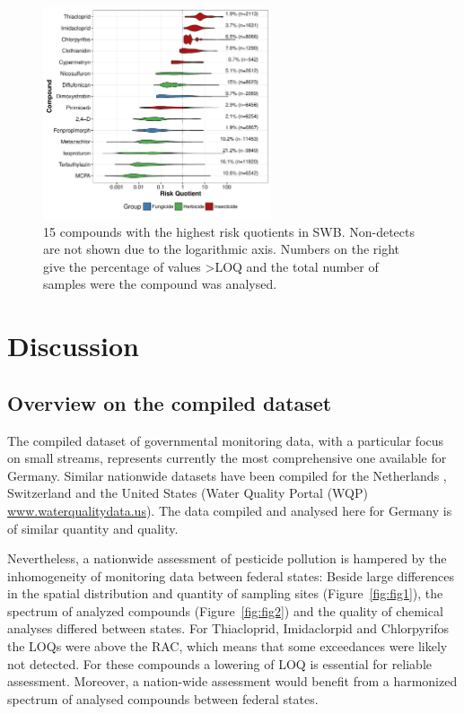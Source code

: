 \documentclass[journal=esthag,manuscript=article]{achemso}
\begin{document}
\begin{figure}[ht]
  \includegraphics[width=0.6\textwidth]{figure6.pdf}
  \caption{15 compounds with the highest risk quotients in SWB. Non-detects are not shown due to the logarithmic axis. Numbers on the right give the percentage of values \textgreater LOQ and the total number of samples were the compound was analysed.
  }
  \label{fig:fig6}
\end{figure}




\section{Discussion}
\subsection{Overview on the compiled dataset}
The compiled dataset of governmental monitoring data, with a particular focus on small streams, represents currently the most comprehensive one available for Germany.
Similar nationwide datasets have been compiled for the Netherlands \citep{vijver_spatial_2008}, Switzerland \citep{munz_pestizidmessungen_2011} and the United States (Water Quality Portal (WQP) \url{www.waterqualitydata.us}).
The data compiled and analysed here for Germany is of similar quantity and quality.

Nevertheless, a nationwide assessment of pesticide pollution is hampered by the inhomogeneity of monitoring data between federal states:
Beside large differences in the spatial distribution and quantity of sampling sites (Figure~\ref{fig:fig1}), the spectrum of analyzed compounds (Figure~\ref{fig:fig2}) and the quality of chemical analyses differed between states. 
For Thiacloprid, Imidaclorpid and Chlorpyrifos the LOQs were above the RAC, which means that some exceedances were likely not detected.
For these compounds a lowering of LOQ is essential for reliable assessment.
Moreover, a nation-wide assessment would benefit from a harmonized spectrum of analysed compounds between federal states.
\end{document}
